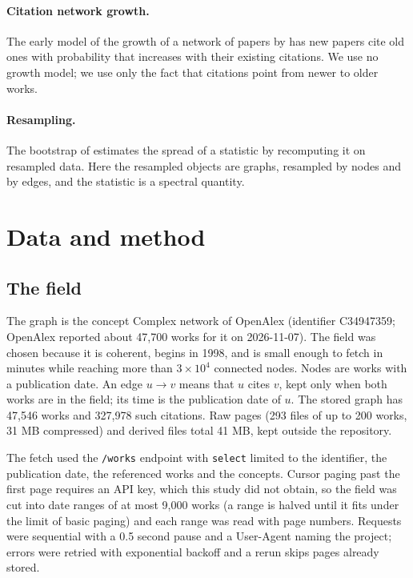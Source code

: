 \documentclass[11pt]{article}
\begin{document}
\paragraph{Citation network growth.} The early model of the growth of a network of papers by
\citet{price1965} has new papers cite old ones with probability that increases with their existing
citations. We use no growth model; we use only the fact that citations point from newer to older
works.

\paragraph{Resampling.} The bootstrap of \citet{efron1979} estimates the spread of a statistic by
recomputing it on resampled data. Here the resampled objects are graphs, resampled by nodes and by
edges, and the statistic is a spectral quantity.

\section{Data and method}
\subsection{The field}
The graph is the concept Complex network of OpenAlex (identifier C34947359; OpenAlex reported about
47,700 works for it on 2026-11-07). The field was chosen because it is coherent, begins in 1998,
and is small enough to fetch in minutes while reaching more than $3\times 10^4$ connected nodes.
Nodes are works with a publication date. An edge $u \to v$ means that $u$ cites $v$, kept only when
both works are in the field; its time is the publication date of $u$. The stored graph has 47,546
works and 327,978 such citations. Raw pages (293 files of up to 200 works, 31 MB compressed) and
derived files total 41 MB, kept outside the repository.

The fetch used the \texttt{/works} endpoint with \texttt{select} limited to the identifier, the
publication date, the referenced works and the concepts. Cursor paging past the first page requires
an API key, which this study did not obtain, so the field was cut into date ranges of at most
9,000 works (a range is halved until it fits under the limit of basic paging) and each range was
read with page numbers. Requests were sequential with a 0.5 second pause and a User-Agent naming the
project; errors were retried with exponential backoff and a rerun skips pages already stored.
\end{document}
